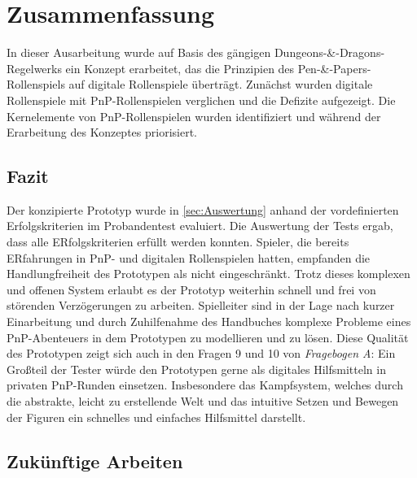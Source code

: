 \chapter{Zusammenfassung}
\label{conclusion}
In dieser Ausarbeitung wurde auf Basis des gängigen Dungeons-\&-Dragons-Regelwerks ein Konzept erarbeitet, das die Prinzipien des Pen-\&-Papers-Rollenspiels auf digitale Rollenspiele überträgt. Zunächst wurden digitale Rollenspiele mit PnP-Rollenspielen verglichen und die Defizite aufgezeigt. Die Kernelemente von PnP-Rollenspielen wurden identifiziert und während der Erarbeitung des Konzeptes priorisiert.\\

\section{Fazit}
Der konzipierte Prototyp wurde in \ref{sec:Auswertung} anhand der vordefinierten Erfolgskriterien im Probandentest evaluiert. Die Auswertung der Tests ergab, dass alle ERfolgskriterien erfüllt werden konnten. Spieler, die bereits ERfahrungen in PnP- und digitalen Rollenspielen hatten, empfanden die Handlungfreiheit des Prototypen als nicht eingeschränkt. Trotz dieses komplexen und offenen System erlaubt es der Prototyp weiterhin schnell und frei von störenden Verzögerungen zu arbeiten. Spielleiter sind in der Lage nach kurzer Einarbeitung und durch Zuhilfenahme des Handbuches komplexe Probleme eines PnP-Abenteuers in dem Prototypen zu modellieren und zu lösen. Diese Qualität des Prototypen zeigt sich auch in den Fragen 9 und 10 von \emph{Fragebogen A}: Ein Großteil der Tester würde den Prototypen gerne als digitales Hilfsmitteln in privaten PnP-Runden einsetzen. Insbesondere das Kampfsystem, welches durch die abstrakte, leicht zu erstellende Welt und das intuitive Setzen und Bewegen der Figuren ein schnelles und einfaches Hilfsmittel darstellt.


\section{Zukünftige Arbeiten}
\label{sec:futurework}

